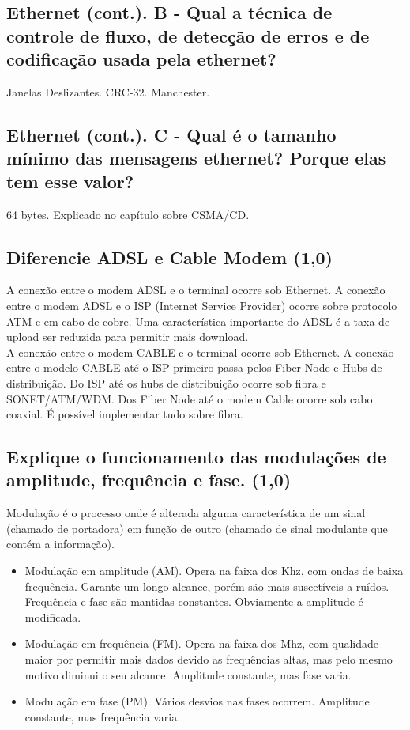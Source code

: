 \documentclass{article}
\begin{document}
\subsection{Ethernet (cont.). B - Qual a técnica de controle de fluxo, de detecção de erros e de codificação
usada pela ethernet?}
Janelas Deslizantes. CRC-32. Manchester.

\subsection{Ethernet (cont.). C - Qual é o tamanho mínimo das mensagens ethernet? Porque elas tem esse valor?}
64 bytes. Explicado no capítulo sobre CSMA/CD.

\subsection{Diferencie ADSL e Cable Modem (1,0)}
A conexão entre o modem ADSL e o terminal ocorre sob Ethernet. A conexão entre o modem ADSL e o ISP (Internet Service Provider) ocorre sobre protocolo ATM e em cabo de cobre. Uma característica importante do ADSL é a taxa de upload ser reduzida para permitir mais download.\\
A conexão entre o modem CABLE e o terminal ocorre sob Ethernet. A conexão entre o modelo CABLE até o ISP primeiro passa pelos Fiber Node e Hubs de distribuição. Do ISP até os hubs de distribuição ocorre sob fibra e SONET/ATM/WDM. Dos Fiber Node até o modem Cable ocorre sob cabo coaxial. É possível implementar tudo sobre fibra.

\subsection{Explique o funcionamento das modulações de amplitude, frequência e fase. (1,0)}
Modulação é o processo onde é alterada alguma característica de um sinal
(chamado de portadora) em função de outro (chamado de sinal modulante que contém
a informação).

\begin{itemize}
	\item Modulação em amplitude (AM). Opera na faixa dos Khz, com ondas de
baixa frequência. Garante um longo alcance, porém são mais suscetíveis a ruídos.
Frequência e fase são mantidas constantes. Obviamente a amplitude é modificada.
	\item Modulação em frequência (FM). Opera na faixa dos Mhz, com
qualidade maior por permitir mais dados devido as frequências altas, mas pelo
mesmo motivo diminui o seu alcance. Amplitude constante, mas fase varia.
	\item Modulação em fase (PM). Vários desvios nas fases ocorrem.
Amplitude constante, mas frequência varia.
\end{itemize}
\end{document}
